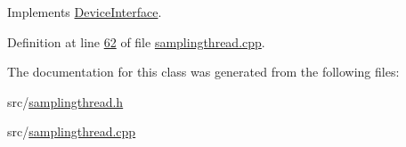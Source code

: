 Implements \hyperlink{classDeviceInterface_a101b3b53a01add866737920e03a850a8}{Device\+Interface}.



Definition at line \hyperlink{samplingthread_8cpp_source_l00062}{62} of file \hyperlink{samplingthread_8cpp_source}{samplingthread.\+cpp}.



The documentation for this class was generated from the following files\+:\begin{DoxyCompactItemize}
\item 
src/\hyperlink{samplingthread_8h}{samplingthread.\+h}\item 
src/\hyperlink{samplingthread_8cpp}{samplingthread.\+cpp}\end{DoxyCompactItemize}
